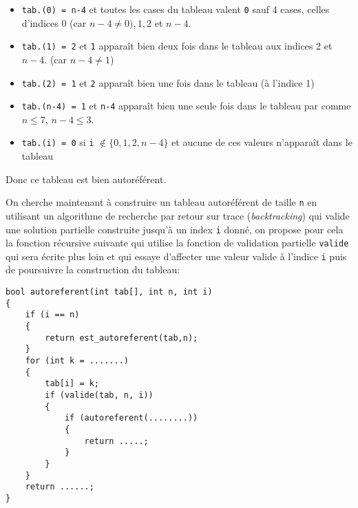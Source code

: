 \documentclass[11pt,a4paper]{article}
\begin{document}
\begin{Exercise}[title = {Tableaux autoréférents}, origin = {\bac \; {\sc oraux ccinp 2024}, {\sc mpi} } ]
{\begin{itemize}
        \item {\tt tab.(0) = n-4} et toutes les cases du tableau valent {\tt 0} sauf 4 cases, celles d'indices $0$ (car $n-4 \neq 0), 1, 2$ et $n-4$.
        \item {\tt tab.(1) = 2} et {\tt 1} apparaît bien deux fois dans le tableau aux indices 2 et $n-4$. (car $n-4 \neq 1$) 
        \item {\tt tab.(2) = 1} et {\tt 2} apparaît bien une fois dans le tableau (à l'indice 1)
        \item {\tt tab.(n-4) = 1} et {\tt n-4} apparaît bien une seule fois dans le tableau par comme $n \leqslant 7$, $n-4 \leqslant 3$.
        \item {\tt tab.(i) = 0} si {\tt i} $\notin \{0,1,2,n-4\}$ et aucune de ces valeurs n'apparaît dans le tableau
     \end{itemize}
     Donc ce tableau est bien autoréférent.
     }
	
	\NRet
    On cherche maintenant à construire un tableau autoréférent de taille {\tt n} en utilisant un algorithme de recherche par retour sur trace (\textit{backtracking}) qui valide une solution partielle construite jusqu'à un index {\tt i} donné, on propose pour cela la fonction récursive suivante qui utilise la fonction de validation partielle {\tt valide} qui sera écrite plus loin et qui essaye d'affecter une valeur valide à l'indice {\tt i} puis de poursuivre la construction du tableau: \\
\begin{verbatim}
bool autoreferent(int tab[], int n, int i)
{
    if (i == n)
    {
        return est_autoreferent(tab,n);
    }
    for (int k = .......)
    {
        tab[i] = k;
        if (valide(tab, n, i))
        {
            if (autoreferent(........))
            {
                return .....;
            }
        }
    }
    return ......;
}
\end{verbatim}
    \Ret
	

\end{Exercise}
\end{document}
